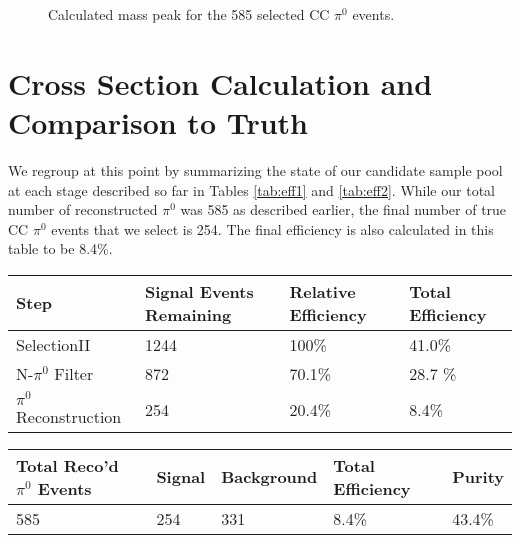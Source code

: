 \documentclass[a4paper]{article}
\begin{document}
\begin{figure}[h!]
\centering
{}
\caption{Calculated mass peak for the 585 selected CC $\pi^0$ events. }
\label{fig:mass}
\end{figure}


\newpage
\section{Cross Section Calculation and Comparison to Truth}

We regroup at this point by summarizing the state of our candidate sample pool at each stage described so far in Tables \ref{tab:eff1} and \ref{tab:eff2}. While our total number of reconstructed $\pi^0$ was 585 as described earlier, the final number of true CC $\pi^0$ events that we select is 254. The final efficiency is also calculated in this table to be 8.4\%.  

\begin{minipage}{\linewidth}
\centering
{} \label{tab:eff1} 
 \begin{tabular}{| l | l | l | l |}
 \hline
 Step & Signal Events Remaining & Relative Efficiency & Total Efficiency \\ [0.5ex]
 \hline\hline

\hline
  SelectionII & 1244 & 100\% & 41.0\% \\ 
\hline
  N-$\pi^0$ Filter & 872 & 70.1\% & 28.7 \% \\ \hline
  $\pi^0$ Reconstruction & 254 & 20.4\% & 8.4\% \\ \hline
   \end{tabular}
\end{minipage}

\begin{minipage}{\linewidth}
\centering
{} \label{tab:eff2} 
 \begin{tabular}{| l | l | l | l | l |}
 \hline
 Total Reco'd $\pi^0$ Events & Signal & Background & Total Efficiency & Purity \\ [0.5ex]
 \hline\hline

\hline
  585 & 254 & 331 & 8.4\% & 43.4\% \\ 
\hline 
 
   \end{tabular}
\end{minipage}
\end{document}
